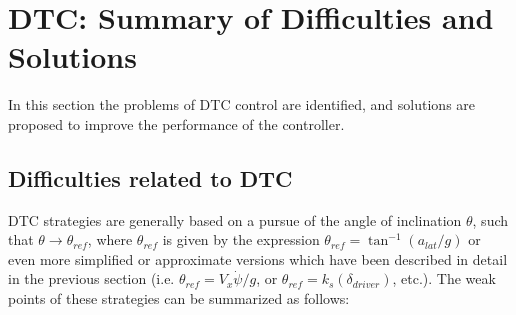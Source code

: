 \section{DTC: Summary of Difficulties and Solutions}

In this section the problems of DTC control are identified, and solutions are proposed to improve the performance of the controller.

\subsection{Difficulties related to DTC} 

DTC strategies are generally based on a pursue of the angle of inclination $\theta$, such that $\theta\rightarrow\theta_{ref}$, where $\theta_{ref}$ is given by the expression  $\theta_{ref}=\tan^{-1}(a_{lat}/g)$ or even more simplified or approximate versions which have been described in detail in the previous section (i.e. $\theta_{ref}=V_{x}\dot{\psi}/g$, or $\theta_{ref}=k_{s}(\delta_{driver})$, etc.). The weak points of these strategies can be summarized as follows:
